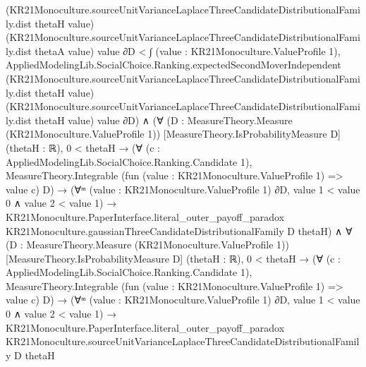 \documentclass[10pt]{article}
\begin{document}
\begin{ReviewVerbatim}
                                    (KR21Monoculture.sourceUnitVarianceLaplaceThreeCandidateDistributionalFamily.dist
                                      thetaH value)
                                    (KR21Monoculture.sourceUnitVarianceLaplaceThreeCandidateDistributionalFamily.dist
                                      thetaA value)
                                    value ∂D <
                                ∫ (value : KR21Monoculture.ValueProfile 1),
                                  AppliedModelingLib.SocialChoice.Ranking.expectedSecondMoverIndependent
                                    (KR21Monoculture.sourceUnitVarianceLaplaceThreeCandidateDistributionalFamily.dist
                                      thetaH value)
                                    (KR21Monoculture.sourceUnitVarianceLaplaceThreeCandidateDistributionalFamily.dist
                                      thetaH value)
                                    value ∂D) ∧
                (∀ (D : MeasureTheory.Measure (KR21Monoculture.ValueProfile 1)) [MeasureTheory.IsProbabilityMeasure D]
                    (thetaH : ℝ),
                    0 < thetaH →
                      (∀ (c : AppliedModelingLib.SocialChoice.Ranking.Candidate 1),
                          MeasureTheory.Integrable (fun (value : KR21Monoculture.ValueProfile 1) => value c) D) →
                        (∀ᵐ (value : KR21Monoculture.ValueProfile 1) ∂D, value 1 < value 0 ∧ value 2 < value 1) →
                          KR21Monoculture.PaperInterface.literal_outer_payoff_paradox
                            KR21Monoculture.gaussianThreeCandidateDistributionalFamily D thetaH) ∧
                  ∀ (D : MeasureTheory.Measure (KR21Monoculture.ValueProfile 1)) [MeasureTheory.IsProbabilityMeasure D]
                    (thetaH : ℝ),
                    0 < thetaH →
                      (∀ (c : AppliedModelingLib.SocialChoice.Ranking.Candidate 1),
                          MeasureTheory.Integrable (fun (value : KR21Monoculture.ValueProfile 1) => value c) D) →
                        (∀ᵐ (value : KR21Monoculture.ValueProfile 1) ∂D, value 1 < value 0 ∧ value 2 < value 1) →
                          KR21Monoculture.PaperInterface.literal_outer_payoff_paradox
                            KR21Monoculture.sourceUnitVarianceLaplaceThreeCandidateDistributionalFamily D thetaH
\end{ReviewVerbatim}
\end{document}
